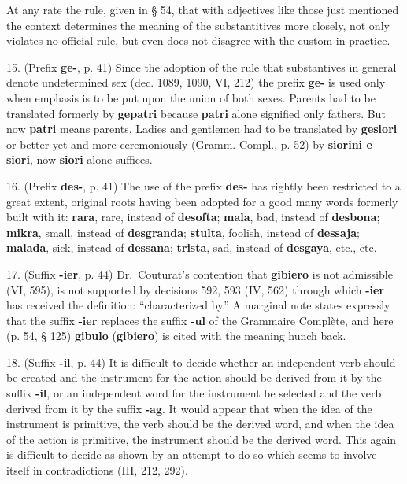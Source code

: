At any rate the rule, given in § 54, that with adjectives like those just mentioned the context determines the meaning of the substantitives more closely, not only violates no official rule, but even does not disagree with the custom in practice.\footnotemark[1]

15. (Prefix \textbf{ge-}, p. 41) Since the adoption of the rule that substantives in general denote undetermined sex (dec. 1089, 1090, VI, 212) the prefix \textbf{ge-} is used only when emphasis is to be put upon the union of both sexes. Parents had to be translated formerly by \textbf{gepatri} because \textbf{patri} alone signified only fathers. But now \textbf{patri} means parents. Ladies and gentlemen had to be translated by \textbf{gesiori} or better yet and more ceremoniously (Gramm. Compl., p. 52) by \textbf{siorini e siori}, now \textbf{siori} alone suffices.

16. (Prefix \textbf{des-}, p. 41) The use of the prefix \textbf{des-} has rightly been restricted to a great extent, original roots having been adopted for a good many words formerly built with it: \textbf{rara}, rare, instead of \textbf{desofta}; \textbf{mala}, bad, instead of \textbf{desbona}; \textbf{mikra}, small, instead of \textbf{desgranda}; \textbf{stulta}, foolish, instead of \textbf{dessaja}; \textbf{malada}, sick, instead of \textbf{dessana}; \textbf{trista}, sad, instead of \textbf{desgaya}, etc., etc.

17. (Suffix \textbf{-ier}, p. 44) Dr.~Couturat's contention that \textbf{gibiero} is not admissible (VI, 595), is not supported by decisions 592, 593 (IV, 562) through which \textbf{-ier} has received the definition: ``characterized by.'' A marginal note states expressly that the suffix \textbf{-ier} replaces the suffix \textbf{-ul} of the Grammaire Complète, and here (p. 54, § 125) \textbf{gibulo} (\textbf{gibiero}) is cited with the meaning hunch back.

18. (Suffix \textbf{-il}, p. 44) It is difficult to decide whether an independent verb should be created and the instrument for the action should be derived from it by the suffix \textbf{-il}, or an independent word for the instrument be selected and the verb derived from it by the suffix \textbf{-ag}. It would appear that when the idea of the instrument is primitive, the verb should be the derived word, and when the idea of the action is primitive, the instrument should be the derived word. This again is difficult to decide as shown by an attempt to do so which seems to involve itself in contradictions (III, 212, 292).

